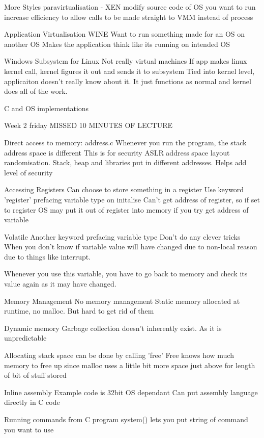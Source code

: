 \documentclass{article}
\begin{document}
	More Styles
		paravirtualisation - XEN
			modify source code of OS you want to run
			increase efficiency to allow calls to be made straight to VMM instead of process

		Application Virtualisation
			WINE
			Want to run something made for an OS on another OS
			Makes the application think like its running on intended OS

		Windows Subsystem for Linux
			Not really virtual machines
			If app makes linux kernel call, kernel figures it out and sends it to subsystem
			Tied into kernel level, applicaiton doesn't really know about it. It just functions as normal and kernel does all of the work.

	C and OS implementations

Week 2 friday
	MISSED 10 MINUTES OF LECTURE

	Direct access to memory: address.c
		Whenever you run the program, the stack address space is different
		This is for security
			ASLR address space layout randomisation.
				Stack, heap and libraries put in different addresses.
				Helps add level of security

	Accessing Registers
		Can choose to store something in a register
		Use keyword 'register' prefacing variable type on initalise
		Can't get address of register, so if set to register OS may put it out of register into memory if you try get address of variable

	Volatile
		Another keyword prefacing variable type
		Don't do any clever tricks
			When you don't know if variable value will have changed due to non-local reason due to things like interrupt.

		Whenever you use this variable, you have to go back to memory and check its value again as it may have changed.

	Memory Management
		No memory management
		Static memory allocated at runtime, no malloc. But hard to get rid of them

	Dynamic memory
		Garbage collection doesn't inherently exist. As it is unpredictable

		Allocating stack space can be done by calling 'free'
		Free knows how much memory to free up since malloc uses a little bit more space just above for length of bit of stuff stored

	Inline assembly
		Example code is 32bit OS dependant
		Can put assembly language directly in C code

	Running commands from C program
		system() lets you put string of command you want to use
\end{document}
